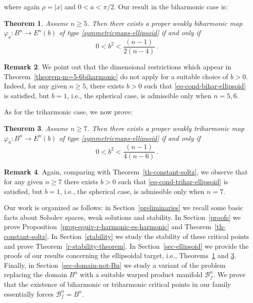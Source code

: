 \documentclass[11pt]{amsart}
\theoremstyle{plain}
\newtheorem{theorem}                {Theorem}      [section]
\theoremstyle{definition}
\newtheorem{remark}       [theorem]  {Remark}
\numberwithin{equation}{section}
\def \link {~}
\def \b{\mathcal B}
\numberwithin{equation}{section}
\begin{document}
where again $\rho=|x|$ and $0< a < \pi/2$. Our result in the biharmonic case is:
\begin{theorem}\label{th-ellipsoid-biharm}
Assume  $n\geq 5$.  Then there exists a proper weakly biharmonic map $\varphi_a:B^n \to E^n(b)$ of type \eqref{symmetricmaps-ellipsoid} if and only if 
\begin{equation}\label{eq-cond-bihar-ellipsoid}
0<b^2<\frac{(n-1)}{2(n-4)}\,.
\end{equation} 
\end{theorem}
\begin{remark}
We point out that the dimensional restrictions which appear in Theorem\link\ref{theorem-m=5-6biharmonic} do not apply for a suitable choice of $b>0$. Indeed, for any given $n \geq 5$, there exists $b>0$ such that \eqref{eq-cond-bihar-ellipsoid} is satisfied, but $b=1$, i.e., the spherical case, is admissible only when $n=5,6$.
\end{remark}

As for the triharmonic case, we now prove:
\begin{theorem}\label{th-ellipsoid-triharm}
Assume  $n\geq 7$.  Then there exists a proper weakly triharmonic map $\varphi_a:B^n \to E^n(b)$ of type \eqref{symmetricmaps-ellipsoid} if and only if
\begin{equation}\label{eq-cond-trihar-ellipsoid}
0<b^2<\frac{(n-1)}{4(n-6)}\,.
\end{equation} 
\end{theorem}
\begin{remark}
Again, comparing with Theorem~\ref{th-constant-soltz}, we observe that for any given $n \geq 7$ there exists $b>0$ such that \eqref{eq-cond-trihar-ellipsoid} is satisfied, but $b=1$, i.e., the spherical case, is admissible only when $n=7$. 
\end{remark}
Our work is organized as follows: in Section~\ref{preliminaries} we recall some basic facts about Sobolev spaces, weak solutions and stability. In Section~\ref{proofs} we prove Proposition~\ref{prop-equiv-r-harmonic-es-harmonic} and Theorem~\ref{th-constant-soltz}. In Section~\ref{stability} we study the stability of these critical points and prove Theorem~\ref{r-stability-theorem}. In Section~\ref{sec-ellipsoid} we provide the proofs of our results concerning the ellipsoidal target, i.e., Theorems~\ref{th-ellipsoid-biharm} and \ref{th-ellipsoid-triharm}. Finally, in Section~\ref{sec-domain-not-Bn} we study a variant of the problem replacing the domain $B^n$ with a suitable warped product manifold $\b^n_f$. We prove that the existence of biharmonic or triharmonic critical points in our family essentially forces $\b^n_f=B^n$.
\end{document}
